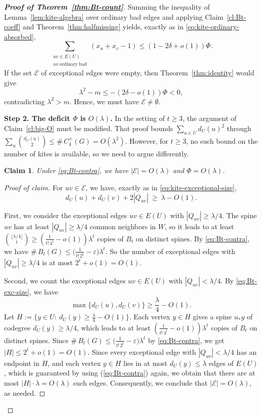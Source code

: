 \documentclass[10pt,a4paper]{amsart}
\newtheorem{claim}[theorem]{Claim}
\renewcommand{\le}{\leqslant}
\renewcommand{\ge}{\geqslant}
\begin{document}
\begin{proof}[{\bf Proof of Theorem~\ref{thm:Bt-count}}]
Summing the inequality of Lemma~\ref{lem:kite-algebra} over ordinary bad edges
and applying Claim~\ref{cl:Bt-coeff} and Theorem~\ref{thm:halfmissing} yields,
exactly as in \eqref{eq:kite-ordinary-absorbed},
\begin{equation}\label{eq:Bt-ordinary}
   \sum_{\substack{uv\in E(U)\\ uv\ \mathrm{ordinary\ bad}}}(x_u+x_v-1)
   \le(1-2\delta+o(1))\Phi .
\end{equation}
If the set $\mathcal E$ of exceptional edges were empty, then
Theorem~\ref{thm:identity} would give
$$\lambda^2-m\le-(2\delta-o(1))\Phi < 0, $$  contradicting $\lambda^2>m$.  Hence, we must have 
$\mathcal E\neq\emptyset$.

\medskip
\noindent\textbf{Step 2. The deficit $\Phi$ is $O(\lambda)$.}
In the setting of $t\ge 3$, the argument of Claim~\ref{cl:big-O} must be modified.  
That proof bounds 
$\sum_{u\in U}d_U(u)^2$ through $\sum_u\binom{d_U(u)}{2}\le
\texttt{\#}\,C_4^+(G)=O(\lambda^2)$. However, for $t\ge3$,  no such bound on the number of
kites is available, so we need to argue differently.

\begin{claim}\label{cl:Bt-deficit}
Under \eqref{eq:Bt-contra}, we have $|\mathcal E|=O(\lambda)$ and $\Phi=O(\lambda)$.
\end{claim}

\begin{proof}[Proof of claim]
For $uv\in\mathcal E$, we have, exactly as in \eqref{eq:kite-exceptional-size},
\begin{equation}\label{eq:Bt-exc-size}
   d_U(u)+d_U(v)+2|Q_{uv}|\ \ge\ \lambda-O(1).
\end{equation}


First, we 
consider the {exceptional edges $uv\in E(U)$ with $|Q_{uv}|\ge\lambda/4$.}  
The spine $uv$ has
 at least $|Q_{uv}|\ge\lambda/4$ common neighbors in $W$, so it leads to at least
$\binom{\lfloor\lambda/4\rfloor}{t}\ge(\tfrac1{t!\,4^t}-o(1))\lambda^t$ copies
of $B_t$ on distinct spines. By \eqref{eq:Bt-contra}, we have $\texttt{\#}\,B_t(G)\le\bigl(\frac{1}{t!\,2^{t}}-\varepsilon\bigr)\lambda^{t}$. So the number of exceptional edges with $|Q_{uv}| \ge \lambda /4$ is at most
$ 2^t + o(1)= O(1)$. 

Second, we count the exceptional edges $uv\in E(U)$ with $|Q_{uv}|<\lambda/4$.  
By \eqref{eq:Bt-exc-size}, we have 
$$ \max\{d_U(u),d_U(v)\}\ge \frac\lambda4-O(1).$$ 
Let
$H:=\{y\in U:\ d_U(y)\ge\tfrac\lambda4-O(1)\}$.  Each vertex $y\in H$ gives a spine
$u_*y$ of codegree $d_U(y)\ge\lambda/4$, which leads to at least
$(\tfrac1{t!\,4^t}-o(1))\lambda^t$ copies of $B_t$ on distinct spines. Since  $\texttt{\#}\,B_t(G)\le\bigl(\frac{1}{t!\,2^{t}}-\varepsilon\bigr)\lambda^{t}$ by \eqref{eq:Bt-contra}, we get 
$|H|\le2^t+o(1)=O(1)$. 
Since every exceptional edge with $|Q_{uv}|<\lambda/4$
has an endpoint in $H$, and each vertex $y\in H$ lies in at most $d_U(y)\le\lambda$
edges of $E(U)$, which is guaranteed by using (\ref{eq:Bt-contra}) again, we obtain that there are at most $|H|\cdot\lambda=O(\lambda)$ such edges.
Consequently, we conclude that $|\mathcal E|=O(\lambda)$, as needed. 


\end{proof}
\end{proof}
\end{document}

